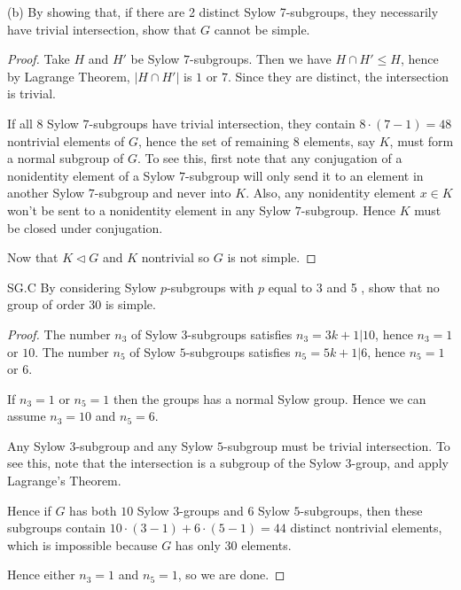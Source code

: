 (b) By showing that, if there are 2 distinct Sylow 7-subgroups, they necessarily have trivial intersection, show that $G$ cannot be simple.
\begin{proof}
	 Take $H$ and $H'$ be Sylow $7$-subgroups. Then we have $H \cap H' \le H$, hence by Lagrange Theorem, $|H \cap H'|$ is $1 $ or $7$. Since they are distinct, the intersection is trivial.

	 If all $8$ Sylow $7$-subgroups have trivial intersection, they contain $8 \cdot (7 - 1) = 48$ nontrivial elements of $G$, hence the set of remaining $8$ elements, say $K$, must form a normal subgroup of $G$. To see this, first note that any conjugation of a nonidentity element of a Sylow $7$-subgroup will only send it to an element in another Sylow $7$-subgroup and never into $K$. Also, any nonidentity element $x \in K$ won't be sent to a nonidentity element in any Sylow $7$-subgroup. Hence $K$ must be closed under conjugation.

	 Now that $K\triangleleft G$ and $K$ nontrivial so $G$ is not simple.
\end{proof}


SG.C By considering Sylow $p$-subgroups with $p$ equal to 3 and 5 , show that no group of order 30 is simple.
\begin{proof}
	The number $n_3$ of Sylow $3$-subgroups satisfies  $n_3 = 3k+1 | 10$, hence  $n_3 = 1$ or $10$. The number $n_5$ of Sylow  $5$-subgroups satisfies $n_5 = 5k+1 | 6$, hence $n_5 = 1$ or $6$.

	If $n_3 = 1$ or $n_5 = 1 $ then the groups has a normal Sylow group. Hence we can assume $n_3 = 10$ and $n_5 = 6$.

	Any Sylow $3$-subgroup and any Sylow $5$-subgroup must be trivial intersection. To see this, note that the intersection is a subgroup of the Sylow $3$-group, and apply Lagrange's Theorem.

	Hence if $G$ has both $10$ Sylow $3$-groups and $6$ Sylow $5$-subgroups, then these subgroups contain $10 \cdot (3-1) + 6 \cdot (5-1) = 44$ distinct nontrivial elements, which is impossible because $G$ has only $30$ elements.

	Hence either $n_3 = 1$ and $n_5 = 1$, so we are done.
\end{proof}

